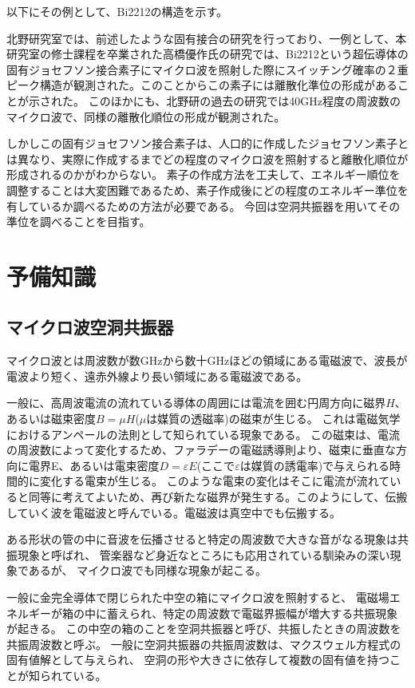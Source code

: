 以下にその例として、Bi2212の構造を示す。\cite{びすます}

北野研究室では、前述したような固有接合の研究を行っており、一例として、本研究室の修士課程を卒業された高橋優作氏の研究\cite{たかはし}では、Bi2212という超伝導体の固有ジョセフソン接合素子にマイクロ波を照射した際にスイッチング確率の２重ピーク構造が観測された。このことからこの素子には離散化準位の形成があることが示された。
このほかにも、北野研の過去の研究では40GHz程度の周波数のマイクロ波で、同様の離散化順位の形成が観測された。

しかしこの固有ジョセフソン接合素子は、人口的に作成したジョセフソン素子とは異なり、実際に作成するまでどの程度のマイクロ波を照射すると離散化順位が形成されるのかがわからない。
素子の作成方法を工夫して、エネルギー順位を調整することは大変困難であるため、素子作成後にどの程度のエネルギー準位を有しているか調べるための方法が必要である。
今回は空洞共振器を用いてその準位を調べることを目指す。

\section{予備知識}
\subsection{マイクロ波空洞共振器}
マイクロ波とは周波数が数GHzから数十GHzほどの領域にある電磁波で、波長が電波より短く、遠赤外線より長い領域にある電磁波である。

一般に、高周波電流の流れている導体の周囲には電流を囲む円周方向に磁界$H$、あるいは磁束密度$B =μH$($μ$は媒質の透磁率)の磁束が生じる。
これは電磁気学におけるアンペールの法則として知られている現象である。
この磁束は、電流の周波数によって変化するため、ファラデーの電磁誘導則より、磁束に垂直な方向に電界E、あるいは電束密度$D =εE$(ここで$ε$は媒質の誘電率)で与えられる時間的に変化する電束が生じる。
このような電束の変化はそこに電流が流れていると同等に考えてよいため、再び新たな磁界が発生する。このようにして、伝搬していく波を電磁波と呼んでいる。電磁波は真空中でも伝搬する。

ある形状の管の中に音波を伝播させると特定の周波数で大きな音がなる現象は共振現象と呼ばれ、
管楽器など身近なところにも応用されている馴染みの深い現象であるが、
マイクロ波でも同様な現象が起こる。

一般に金完全導体で閉じられた中空の箱にマイクロ波を照射すると、
電磁場エネルギーが箱の中に蓄えられ、特定の周波数で電磁界振幅が増大する共振現象が起きる。
この中空の箱のことを空洞共振器と呼び、共振したときの周波数を共振周波数と呼ぶ。
一般に空洞共振器の共振周波数は、マクスウェル方程式の固有値解として与えられ、
空洞の形や大きさに依存して複数の固有値を持つことが知られている。

